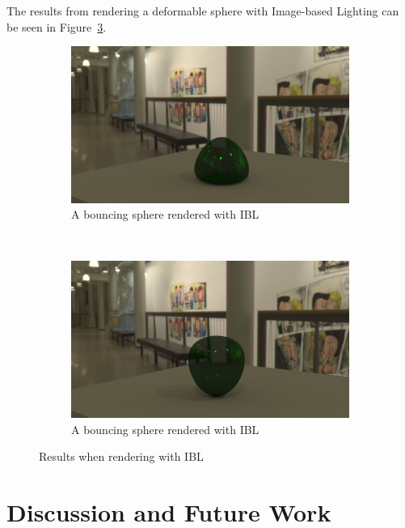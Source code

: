 The results from rendering a deformable sphere with Image-based Lighting can be seen in Figure~\ref{fig:ibl}.

\begin{figure} [h!]
    \begin{subfigure}{\linewidth}
      \includegraphics[width=\linewidth]{img/out_0042.png}

      \caption{A bouncing sphere rendered with IBL}
      \label{fig:ibl1}
    \end{subfigure}%
    \\
    \begin{subfigure}{\linewidth}
      \includegraphics[width=\linewidth]{img/out_0058.png}
      \caption{A bouncing sphere rendered with IBL}
      \label{fig:ibl2}
    \end{subfigure}
    
    \caption{Results when rendering with IBL}
    \label{fig:ibl}
\end{figure} 

\section{Discussion and Future Work}

